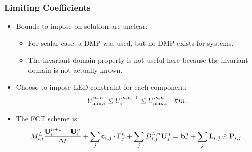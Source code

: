 \documentclass{beamer} \useoutertheme{infolines}
\begin{document}
\begin{frame}
\frametitle{Limiting Coefficients}

\begin{itemize}
  \item Bounds to impose on solution are unclear:
    \begin{itemize}
      \item For scalar case, a DMP was used, but no DMP exists for systems.
      \item The invariant domain property is not useful here
        because the invariant domain is not actually known.
    \end{itemize}
  \item Choose to impose LED constraint for each component:
    \begin{equation}
      U_{\min,i}^{m,n}
        \leq U_i^{m,n+1}
        \leq U_{\max,i}^{m,n}
      \quad \forall m \,.
    \end{equation}
  \item The FCT scheme is
    \begin{equation}
      \lumpedmassentry
        \frac{\solutionvector_i^{n+1}-\solutionvector_i^n}{\dt}
        + \sum_j\gradiententry\cdot\consfluxinterpolant_j^n
        + \sum_j\diffusionmatrixletter\ij^{L,n}\solutionvector_j^n
        = \ssrhs_i^n + \sum_j\limitermatrix\ij\odot\correctionfluxmatrix\ij \eqp
    \end{equation}
\end{itemize}

\end{frame}
\end{document}
